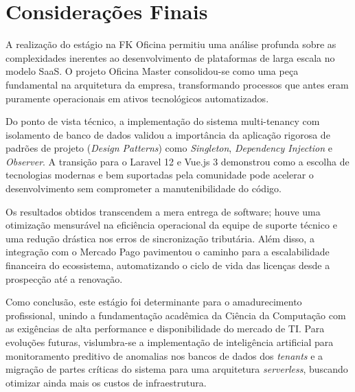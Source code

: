 
\chapter{Considerações Finais}
\label{cap:conclusao}

A realização do estágio na FK Oficina permitiu uma análise profunda sobre as complexidades inerentes ao desenvolvimento de plataformas de larga escala no modelo SaaS. O projeto Oficina Master consolidou-se como uma peça fundamental na arquitetura da empresa, transformando processos que antes eram puramente operacionais em ativos tecnológicos automatizados.

Do ponto de vista técnico, a implementação do sistema multi-tenancy com isolamento de banco de dados validou a importância da aplicação rigorosa de padrões de projeto (\textit{Design Patterns}) como \textit{Singleton}, \textit{Dependency Injection} e \textit{Observer}. A transição para o Laravel 12 e Vue.js 3 demonstrou como a escolha de tecnologias modernas e bem suportadas pela comunidade pode acelerar o desenvolvimento sem comprometer a manutenibilidade do código.

Os resultados obtidos transcendem a mera entrega de software; houve uma otimização mensurável na eficiência operacional da equipe de suporte técnico e uma redução drástica nos erros de sincronização tributária. Além disso, a integração com o Mercado Pago pavimentou o caminho para a escalabilidade financeira do ecossistema, automatizando o ciclo de vida das licenças desde a prospecção até a renovação.

Como conclusão, este estágio foi determinante para o amadurecimento profissional, unindo a fundamentação acadêmica da Ciência da Computação com as exigências de alta performance e disponibilidade do mercado de TI. Para evoluções futuras, vislumbra-se a implementação de inteligência artificial para monitoramento preditivo de anomalias nos bancos de dados dos \textit{tenants} e a migração de partes críticas do sistema para uma arquitetura \textit{serverless}, buscando otimizar ainda mais os custos de infraestrutura.
